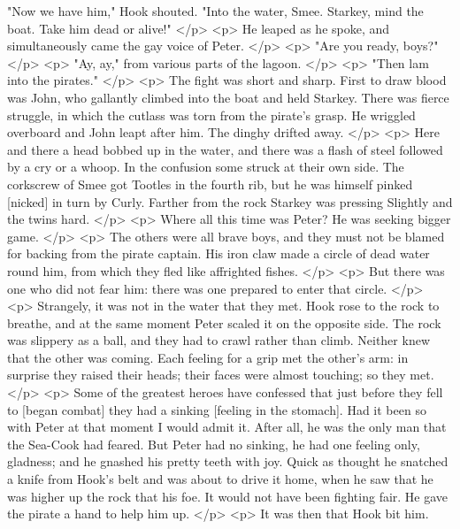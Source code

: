       "Now we have him," Hook shouted. "Into the water, Smee. Starkey, mind the
      boat. Take him dead or alive!"
    </p>
    <p>
      He leaped as he spoke, and simultaneously came the gay voice of Peter.
    </p>
    <p>
      "Are you ready, boys?"
    </p>
    <p>
      "Ay, ay," from various parts of the lagoon.
    </p>
    <p>
      "Then lam into the pirates."
    </p>
    <p>
      The fight was short and sharp. First to draw blood was John, who gallantly
      climbed into the boat and held Starkey. There was fierce struggle, in
      which the cutlass was torn from the pirate's grasp. He wriggled overboard
      and John leapt after him. The dinghy drifted away.
    </p>
    <p>
      Here and there a head bobbed up in the water, and there was a flash of
      steel followed by a cry or a whoop. In the confusion some struck at their
      own side. The corkscrew of Smee got Tootles in the fourth rib, but he was
      himself pinked [nicked] in turn by Curly. Farther from the rock Starkey
      was pressing Slightly and the twins hard.
    </p>
    <p>
      Where all this time was Peter? He was seeking bigger game.
    </p>
    <p>
      The others were all brave boys, and they must not be blamed for backing
      from the pirate captain. His iron claw made a circle of dead water round
      him, from which they fled like affrighted fishes.
    </p>
    <p>
      But there was one who did not fear him: there was one prepared to enter
      that circle.
    </p>
    <p>
      Strangely, it was not in the water that they met. Hook rose to the rock to
      breathe, and at the same moment Peter scaled it on the opposite side. The
      rock was slippery as a ball, and they had to crawl rather than climb.
      Neither knew that the other was coming. Each feeling for a grip met the
      other's arm: in surprise they raised their heads; their faces were almost
      touching; so they met.
    </p>
    <p>
      Some of the greatest heroes have confessed that just before they fell to
      [began combat] they had a sinking [feeling in the stomach]. Had it been so
      with Peter at that moment I would admit it. After all, he was the only man
      that the Sea-Cook had feared. But Peter had no sinking, he had one feeling
      only, gladness; and he gnashed his pretty teeth with joy. Quick as thought
      he snatched a knife from Hook's belt and was about to drive it home, when
      he saw that he was higher up the rock that his foe. It would not have been
      fighting fair. He gave the pirate a hand to help him up.
    </p>
    <p>
      It was then that Hook bit him.
